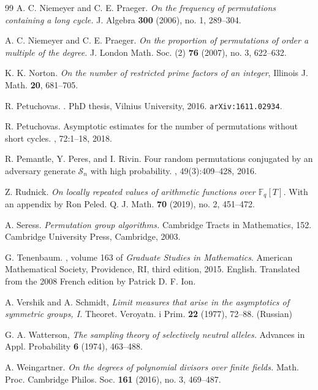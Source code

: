 \begin{thebibliography}{99}
{\sc A. C. Niemeyer and C. E. Praeger}.
\emph{On the frequency of permutations containing a long cycle.} 
J. Algebra {\bf 300} (2006), no. 1, 289--304. 

{\sc A. C. Niemeyer and C. E. Praeger}.
\emph{On the proportion of permutations of order a multiple of the degree.}
J. London Math. Soc. (2) {\bf 76} (2007), no. 3, 622--632. 

{\sc K. K. Norton}.  \emph{On the number of restricted prime factors of
an integer}, Illinois J. Math. {\bf 20}, 681--705.

{\sc R. Petuchovas.}
.
\newblock PhD thesis, Vilnius University, 2016.
\newblock \texttt{arXiv:1611.02934}.

{\sc R. Petuchovas.}
\newblock Asymptotic estimates for the number of permutations without short
  cycles.
, 72:1--18, 2018.


{\sc R. Pemantle, Y. Peres, and I. Rivin.}
\newblock Four random permutations conjugated by an adversary generate
  {$\mathcal{S}_n$} with high probability.
, 49(3):409--428, 2016.

{\sc Z. Rudnick}.
\emph{On locally repeated values of arithmetic functions over $\mathbb{F}_q[T]$.}
With an appendix by Ron Peled.
Q. J. Math. {\bf 70} (2019), no. 2, 451--472. 
%

{\sc A. Seress}.
\emph{Permutation group algorithms.}
Cambridge Tracts in Mathematics, 152. Cambridge University Press, Cambridge, 2003.

{\sc G. Tenenbaum.}
,
  volume 163 of {\em Graduate Studies in Mathematics}.
\newblock American Mathematical Society, Providence, RI, third edition, 2015.
\newblock English. Translated from the 2008 French edition by Patrick D. F. Ion.

%
%
%
%
%
%
%

{\sc A. Vershik and A. Schmidt},
\emph{Limit measures that arise in the asymptotics of symmetric groups, I.}
Theoret. Veroyatn. i Prim. {\bf 22} (1977), 72--88.  (Russian)

{\sc G. A. Watterson},
\emph{The sampling theory of selectively neutral alleles.}
Advances in Appl. Probability {\bf 6} (1974), 463--488. 

{\sc A. Weingartner}.
\emph{On the degrees of polynomial divisors over finite fields.} 
Math. Proc. Cambridge Philos. Soc. {\bf 161} (2016), no. 3, 469--487. 
%



\end{thebibliography}
